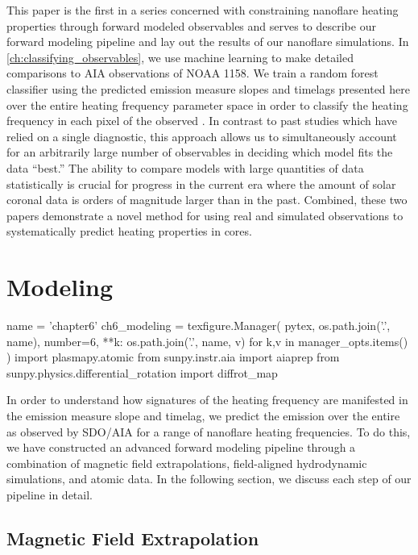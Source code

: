 This paper is the first in a series concerned with constraining nanoflare heating properties through forward modeled observables and serves to describe our forward modeling pipeline and lay out the results of our nanoflare simulations. In \autoref{ch:classifying_observables}, we use machine learning to make detailed comparisons to AIA observations of \AR{} NOAA 1158. We train a random forest classifier using the predicted emission measure slopes and timelags presented here over the entire heating frequency parameter space in order to classify the heating frequency in each pixel of the observed \AR{}. In contrast to past studies which have relied on a single diagnostic, this approach allows us to simultaneously account for an arbitrarily large number of observables in deciding which model fits the data ``best.'' The ability to compare models with large quantities of data statistically is crucial for progress in the current era where the amount of solar coronal data is orders of magnitude larger than in the past.  Combined, these two papers demonstrate a novel method for using real and simulated observations to systematically predict heating properties in \AR{} cores.

\section{Modeling}\label{sec:modeling-observables:modeling}

\begin{pycode}
name = 'chapter6'
ch6_modeling = texfigure.Manager(
    pytex,
    os.path.join('.', name),
    number=6,
    **{k: os.path.join('.', name, v) for k,v in manager_opts.items()}
)
import plasmapy.atomic
from sunpy.instr.aia import aiaprep
from sunpy.physics.differential_rotation import diffrot_map
\end{pycode}

In order to understand how signatures of the heating frequency are manifested in the emission measure slope and timelag, we predict the emission over the entire \AR{} as observed by SDO/AIA for a range of nanoflare heating frequencies. To do this, we have constructed an advanced forward modeling pipeline through a combination of magnetic field extrapolations, field-aligned hydrodynamic simulations, and atomic data. In the following section, we discuss each step of our pipeline in detail.

\subsection{Magnetic Field Extrapolation}\label{sec:modeling-observables:field}

